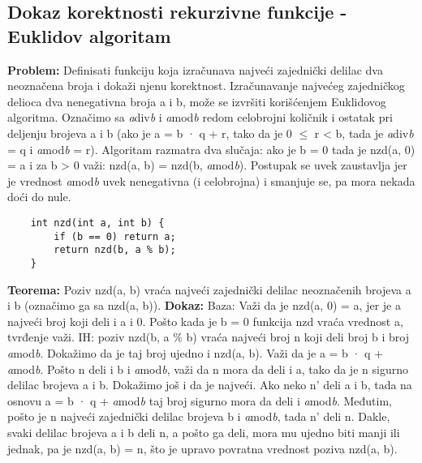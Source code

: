 \documentclass{article}
\begin{document}
\subsection{Dokaz korektnosti rekurzivne funkcije - Euklidov algoritam}
\textbf{Problem:} Definisati funkciju koja izračunava najveći zajednički delilac dva neoznačena broja i dokaži njenu korektnost.\newline
Izračunavanje najvećeg zajedničkog delioca dva nenegativna broja a i b, može se izvršiti korišćenjem Euklidovog algoritma. Označimo sa \textit{a}div\textit{b} i \textit{a}mod\textit{b} redom celobrojni količnik i ostatak pri deljenju brojeva a i b (ako je a = b · q + r, tako da je 
0 $\leq$ r < b, tada je \textit{a}div\textit{b} = q i \textit{a}mod\textit{b} = r). Algoritam razmatra dva slučaja: ako je b = 0 tada je nzd(a, 0) = a i za b > 0 važi: nzd(a, b) = nzd(b, \textit{a}mod\textit{b}). Postupak se uvek zaustavlja jer je vrednost \textit{a}mod\textit{b} uvek nenegativna (i celobrojna) i smanjuje se, pa mora nekada doći do nule.
\begin{lstlisting}
	int nzd(int a, int b) { 
		if (b == 0) return a; 
		return nzd(b, a % b); 
	}
\end{lstlisting}
\textbf{Teorema:} Poziv nzd(a, b) vraća najveći zajednički delilac neoznačenih brojeva a i b (označimo ga sa nzd(a, b)). 
\newline \hspace*{0.4cm}\textbf{Dokaz:}
\newline \hspace*{0.8cm}Baza: Važi da je nzd(a, 0) = a, jer je a najveći broj koji deli i a i 0. \hspace*{0.8cm}Pošto kada je b = 0 funkcija nzd vraća vrednost a, tvrđenje važi. 
\newline \hspace*{0.8cm}IH: poziv nzd(b, a $\%$ b) vraća najveći broj n koji deli broj b i broj \textit{a}mod\textit{b}. \hspace*{0.8cm}Dokažimo da je 	       taj broj ujedno i nzd(a, b). Važi da je a = b · q + \textit{a}mod\textit{b}. \hspace*{0.8cm}Pošto n deli i b i \textit{a}mod\textit{b}, važi 	       da n mora da deli i a, tako da je n sigurno \hspace*{0.8cm}delilac brojeva a i b. Dokažimo još i da je 	       najveći. Ako neko n' deli a \hspace*{0.8cm}i b, tada na osnovu a = b · q + \textit{a}mod\textit{b} taj broj sigurno mora 	       da deli i \hspace*{0.8cm}\textit{a}mod\textit{b}. Međutim, pošto je n najveći zajednički delilac brojeva b i \textit{a}mod\textit{b}, 	       \hspace*{0.8cm}tada n' deli n. Dakle, svaki delilac brojeva a i b deli n, a pošto ga deli, \hspace*{0.8cm}mora mu ujedno 	       biti manji ili jednak, pa je nzd(a, b) = n, što je upravo \hspace*{0.8cm}povratna vrednost poziva nzd(a, b).
\end{document}
